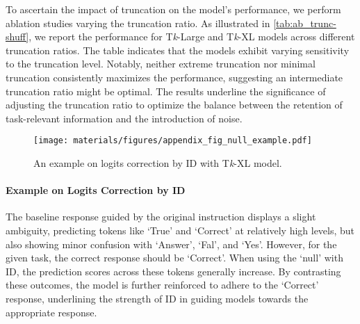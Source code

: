 To ascertain the impact of truncation on the model's performance, we perform ablation studies varying the truncation ratio. As illustrated in \autoref{tab:ab_trunc-shuff}, we report the performance for T\textit{k}-Large and T\textit{k}-XL models across different truncation ratios. The table indicates that the models exhibit varying sensitivity to the truncation level. Notably, neither extreme truncation nor minimal truncation consistently maximizes the performance, suggesting an intermediate truncation ratio might be optimal. The results underline the significance of adjusting the truncation ratio to optimize the balance between the retention of task-relevant information and the introduction of noise.


\begin{figure}
\centering
\texttt{[image: materials/figures/appendix\_fig\_null\_example.pdf]}
\caption{An example on logits correction by ID with T\textit{k}-XL model.}
\label{fig:null_example}
\end{figure}

\paragraph{Example on Logits Correction by ID}

The baseline response guided by the original instruction displays a slight ambiguity, predicting tokens like `True' and `Correct' at relatively high levels, but also showing minor confusion with `Answer', `Fal', and `Yes'. However, for the given task, the correct response should be `Correct'. When using the `null' with ID, the prediction scores across these tokens generally increase. By contrasting these outcomes, the model is further reinforced to adhere to the `Correct' response, underlining the strength of ID in guiding models towards the appropriate response.




